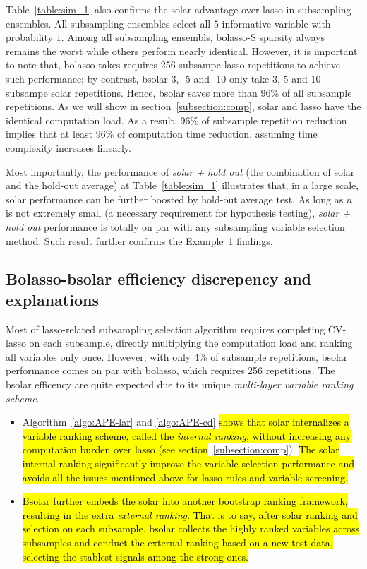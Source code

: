 \documentclass[12pt]{article}
\begin{document}
Table~\ref{table:sim_1} also confirms the solar advantage over lasso in subsampling ensembles. All subsampling ensembles select all $5$ informative variable with probability $1$. Among all subsampling ensembls, bolasso-S sparsity always remains the worst while others perform nearly identical. However, it is important to note that, bolasso takes requires 256 subsampe lasso repetitions to achieve such performance; by contrast, bsolar-3, -5 and -10 only take 3, 5 and 10 subsampe solar repetitions. Hence, bsolar saves more than 96\% of all subsample repetitions. As we will show in section~\ref{subsection:comp}, solar and lasso have the identical computation load. As a result, 96\% of subsample repetition reduction implies that at least 96\% of computation time reduction, assuming time complexity increases linearly. 

Most importantly, the performance of \emph{solar + hold out} (the combination of solar and the hold-out average) at Table~\ref{table:sim_1} illustrates that, in a large scale, solar performance can be further boosted by hold-out average test. As long as $n$ is not extremely small (a necessary requirement for hypothesis testing), \emph{solar + hold out} performance is totally on par with any subsampling variable selection method. Such result further confirms the Example~1 findings. 

\subsection{Bolasso-bsolar efficiency discrepency and explanations}

Most of lasso-related subsampling selection algorithm requires completing CV-lasso on each subsample, directly multiplying the computation load and ranking all variables only once. However, with only 4\% of subsample repetitions, bsolar performance comes on par with bolasso, which requires 256 repetitions. The bsolar efficency are quite expected due to its unique \emph{multi-layer variable ranking scheme}. 

\begin{itemize}
  \item Algorithm~\ref{algo:APE-lar} and \ref{algo:APE-cd} \hl{shows that solar internalizes a variable ranking scheme, called the \emph{internal ranking}, without increasing any computation burden over lasso (see section}~\ref{subsection:comp}). \hl{The solar internal ranking significantly improve the variable selection performance and avoids all the issues mentioned above for lasso rules and variable screening.}
  
  \item \hl{Bsolar further embeds the solar into another bootstrap ranking framework, resulting in the extra \emph{external ranking}. That is to say, after solar ranking and selection on each subsample, bsolar collects the highly ranked variables across subsamples and conduct the external ranking based on a new test data, selecting the stablest signals among the strong ones.}
\end{itemize}
\end{document}
